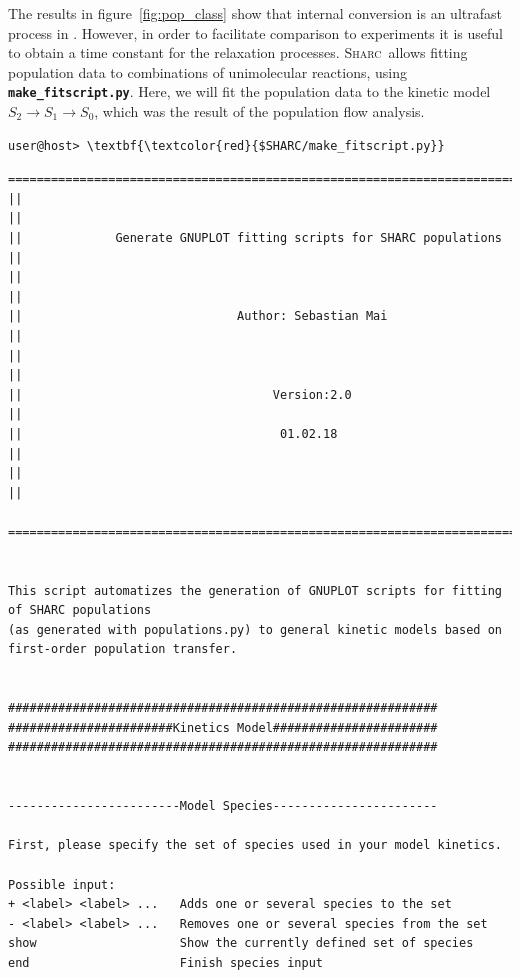 \documentclass[a4paper,11pt,DIV=15,openany]{scrbook}
\newcommand{\sharc}{\textsc{Sharc}}
\newcommand{\ttt}[1]{\textbf{\texttt{#1}}}
\begin{document}
The results in figure~\ref{fig:pop_class} show that internal conversion is an ultrafast process in .
However, in order to facilitate comparison to experiments it is useful to obtain a time constant for the relaxation processes.
\sharc\ allows fitting population data to combinations of unimolecular reactions, using \ttt{make\_fitscript.py}.
Here, we will fit the population data to the kinetic model $S_2\rightarrow S_1 \rightarrow S_0$, which was the result of the population flow analysis.
\begin{Verbatim}[commandchars=\\\{\}]
user@host> \textbf{\textcolor{red}{$SHARC/make_fitscript.py}}
\end{Verbatim}

\begin{oframed}
\footnotesize\begin{Verbatim}[commandchars=\\\{\}]
  ================================================================================
||                                                                                ||
||             Generate GNUPLOT fitting scripts for SHARC populations             ||
||                                                                                ||
||                              Author: Sebastian Mai                             ||
||                                                                                ||
||                                   Version:2.0                                  ||
||                                    01.02.18                                    ||
||                                                                                ||
  ================================================================================


This script automatizes the generation of GNUPLOT scripts for fitting of SHARC populations 
(as generated with populations.py) to general kinetic models based on first-order population transfer.


############################################################
#######################Kinetics Model#######################
############################################################


------------------------Model Species-----------------------

First, please specify the set of species used in your model kinetics.

Possible input:
+ <label> <label> ...   Adds one or several species to the set
- <label> <label> ...   Removes one or several species from the set
show                    Show the currently defined set of species
end                     Finish species input


\end{Verbatim}
\end{oframed}
\end{document}
